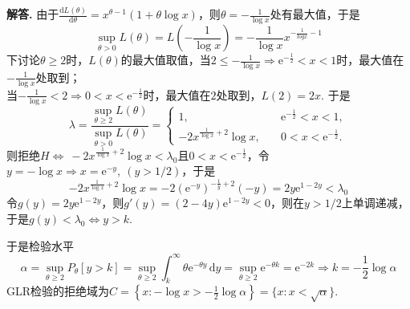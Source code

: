\documentclass[12pt, a4paper, oneside]{ctexart}
\numberwithin{equation}{section}  %
\newenvironment{solution}[1][]{\par\noindent\textbf{#1解答. }}{\smallskip\par}  %
\let\leq=\leqslant %
\let\geq=\geqslant %
\def\d{\mathrm{d}}          %
\def\e{\mathrm{e}}          %
\begin{document}
\begin{solution}
    由于$\frac{\d L(\theta)}{\d \theta} = x^{\theta-1}(1+\theta\log x)$，则$\theta = -\frac{1}{\log x}$处有最大值，于是
    \begin{equation*}
        \sup_{\theta > 0}L(\theta) = L\left(-\frac{1}{\log x}\right) = -\frac{1}{\log x}x^{-\frac{1}{log x}-1}
    \end{equation*}
    下讨论$\theta \geq 2$时，$L(\theta)$的最大值取值，当$2\leq -\frac{1}{\log x}\Rightarrow \e^{-\frac{1}{2}}<x<1$时，最大值在$-\frac{1}{\log x}$处取到；\\
    当$-\frac{1}{\log x} < 2\Rightarrow 0 < x < \e^{-\frac{1}{2}}$时，最大值在$2$处取到，$L(2) = 2x$. 于是
    \begin{equation*}
        \lambda = \frac{\sup_{\theta\geq 2}L(\theta)}{\sup_{\theta > 0}L(\theta)} = \begin{cases}
            1,&\quad \e^{-\frac{1}{2}}<x<1,\\
            -2x^{\frac{1}{\log x}+2}\log x,&\quad 0<x<\e^{-\frac{1}{2}}.
        \end{cases}
    \end{equation*}
    则拒绝$H\iff\ -2x^{\frac{1}{\log x}+2}\log x < \lambda_0$且$0 < x < \e^{-\frac{1}{2}}$，令$y=-\log x\Rightarrow x = \e^{-y},\ (y>1/2)$，于是
    \begin{equation*}
        -2x^{\frac{1}{\log x}+2}\log x = -2(\e^{-y})^{-\frac{1}{y}+2}(-y) = 2y\e^{1-2y} < \lambda_0
    \end{equation*}
    令$g(y) = 2y\e^{1-2y}$，则$g'(y) = (2-4y)\e^{1-2y}<0$，则在$y>1/2$上单调递减，于是$g(y) < \lambda_0\iff y > k$.

    于是检验水平
    \begin{equation*}
        \alpha = \sup_{\theta\geq 2}P_\theta[y>k] = \sup_{\theta\geq 2}\int_k^\infty \theta\e^{-\theta y}\,\d y = \sup_{\theta\geq 2}\e^{-\theta k}=\e^{-2k}\Rightarrow k=-\frac{1}{2}\log \alpha
    \end{equation*}
    GLR检验的拒绝域为$C=\left\{x:-\log x > -\frac{1}{2}\log \alpha\right\} = \{x:x<\sqrt{\alpha}\}$.
\end{solution}
\end{document}
